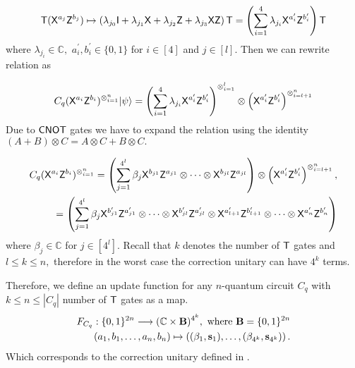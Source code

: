 \begin{equation}
\begin{aligned}
\label{nqubit:eq7}
{\sf T}({\sf X}^{a_{j}}{\sf Z}^{b_{j}})\mapsto \left(\lambda_{j_0} {\sf I} + \lambda_{j_1} {\sf X} + \lambda_{j_2} {\sf Z} + \lambda_{j_3} {\sf X} {\sf Z} \right){\sf T}=\left(\sum_{i=1}^4 \lambda_{j_i} {\sf X}^{a_{i}^\prime}{\sf Z}^{b_{i}^\prime}\right){\sf T}\\
 \end{aligned}
\end{equation}
where $\lambda_{j_i}\in\mathbb{C}, $  $a_{i}^\prime, b_{i}^\prime \in\{0,1\}$ for $i\in[4]$ and $j\in[l].$ Then we can rewrite relation  as


\begin{equation}
\label{nqubit:eq8}
\begin{aligned}
 C_q ({\sf X}^{a_{i}}{\sf Z}^{b_{i}})^{\otimes_{i=1}^{n}}{\lvert}\psi\rangle= \left(\sum_{i=1}^4 \lambda_{j_i} {\sf X}^{a_{i}^\prime}{\sf Z}^{b_{i}^\prime}\right)^{\otimes_{i=1}^{l}} \otimes \left({\sf X}^{a_{i}^\prime}{\sf Z}^{b_{i}^\prime}\right)^{\otimes_{i=l+1}^{n}}\\
\end{aligned}
\end{equation}
Due to ${\sf CNOT}$ gates we have to expand the relation   using the identity $(A+B)\otimes C=A\otimes C + B\otimes C.$


\begin{equation}
\label{nqubit:eq9}
\begin{aligned}
C_q ({\sf X}^{a_{i}}{\sf Z}^{b_{i}})^{\otimes_{i=1}^{n}}=\left(\sum_{j=1}^{4^l} \beta_j {\sf X}^{b_{j1}}{\sf Z}^{a_{j1}} \otimes \cdots \otimes{\sf X}^{b_{jl}}{\sf Z}^{a_{jl}}\right) \otimes \left({\sf X}^{a_{i}^\prime}{\sf Z}^{b_{i}^\prime}\right)^{\otimes_{i=l+1}^{n}}, \\
 =\left(\sum_{j=1}^{4^{l}} \beta_j {\sf X}^{b_{j1}^\prime}{\sf Z}^{a_{j1}^\prime} \otimes \cdots \otimes{\sf X}^{b_{jl}^\prime}{\sf Z}^{a_{jl}^\prime} \otimes {\sf X}^{a_{l+1}^\prime}{\sf Z}^{b_{l+1}^\prime}  \otimes \cdots   \otimes{\sf X}^{a_{n}^\prime}{\sf Z}^{b_{n}^\prime}\right)
 \end{aligned}
\end{equation}
where $\beta_j\in \mathbb{C}$ for $j\in[4^l].$  Recall that $k$ denotes the number of ${\sf T}$ gates and $l\leq k\leq n,$ therefore in the worst case the correction unitary can have $4^k$ terms.



Therefore, we define an update function for any $n$-quantum circuit $C_q$ with $k\leq n\leq |C_q|$ number of ${\sf T}$ gates as a map.
\begin{equation}
\label{nqubit:eq10}
\begin{aligned}
 F_{C_q}:\{0,1\}^{2n}\longrightarrow  (\mathbb{C} \times {\bf B})^{4^k}, \mbox{ where } {\bf B}=\{0,1\}^{2n}\\
  (a_1,b_1,\ldots, a_n,b_n) \mapsto \left((\beta_1, {\bf s}_1),\dots, (\beta_{4^k}, {\bf s}_{4^k})\right).
\end{aligned}
\end{equation}
Which corresponds to the correction unitary defined in .
